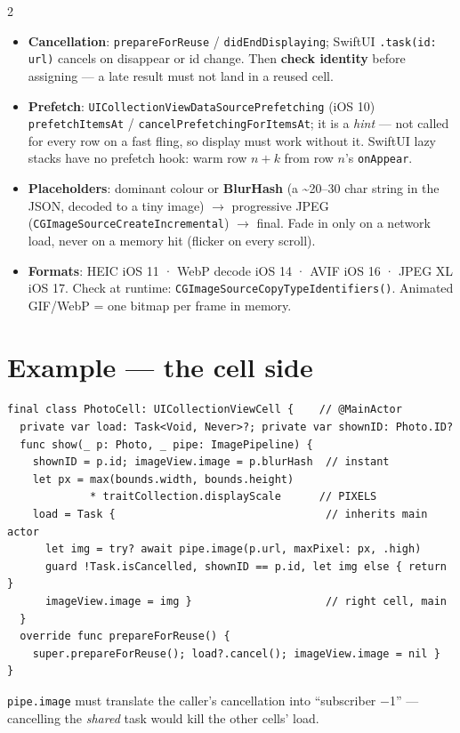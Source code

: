 \documentclass[8pt]{extarticle}
\newcommand\ct[1]{\texttt{#1}}
\begin{document}
\begin{multicols}{2}
\begin{itemize}
  \item \textbf{Cancellation}: \ct{prepareForReuse} / \ct{didEndDisplaying}; SwiftUI
        \ct{.task(id: url)} cancels on disappear or id change. Then \textbf{check identity}
        before assigning — a late result must not land in a reused cell.
  \item \textbf{Prefetch}: \ct{UICollectionViewDataSourcePrefetching} (iOS 10)
        \ct{prefetchItemsAt} / \ct{cancelPrefetchingForItemsAt}; it is a \emph{hint} —
        not called for every row on a fast fling, so display must work without it. SwiftUI
        lazy stacks have no prefetch hook: warm row $n{+}k$ from row $n$'s \ct{onAppear}.
  \item \textbf{Placeholders}: dominant colour or \textbf{BlurHash} (a \textasciitilde20–30
        char string in the JSON, decoded to a tiny image) $\to$ progressive JPEG
        (\ct{CGImageSourceCreateIncremental}) $\to$ final. Fade in only on a network load,
        never on a memory hit (flicker on every scroll).
  \item \textbf{Formats}: HEIC iOS 11 · WebP decode iOS 14 · AVIF iOS 16\unverified{} ·
        JPEG XL iOS 17. Check at runtime: \ct{CGImageSourceCopyTypeIdentifiers()}.
        Animated GIF/WebP = one bitmap per frame in memory.
\end{itemize}

\columnbreak

\section{Example — the cell side}
\begin{lstlisting}[language=SwiftSheet]
final class PhotoCell: UICollectionViewCell {    // @MainActor
  private var load: Task<Void, Never>?; private var shownID: Photo.ID?
  func show(_ p: Photo, _ pipe: ImagePipeline) {
    shownID = p.id; imageView.image = p.blurHash  // instant
    let px = max(bounds.width, bounds.height)
             * traitCollection.displayScale      // PIXELS
    load = Task {                                 // inherits main actor
      let img = try? await pipe.image(p.url, maxPixel: px, .high)
      guard !Task.isCancelled, shownID == p.id, let img else { return }
      imageView.image = img }                     // right cell, main
  }
  override func prepareForReuse() {
    super.prepareForReuse(); load?.cancel(); imageView.image = nil }
}
\end{lstlisting}
{\scriptsize\ct{pipe.image} must translate the caller's cancellation into
``subscriber $-$1'' — cancelling the \emph{shared} task would kill the other cells' load.\par}


\end{multicols}
\end{document}
